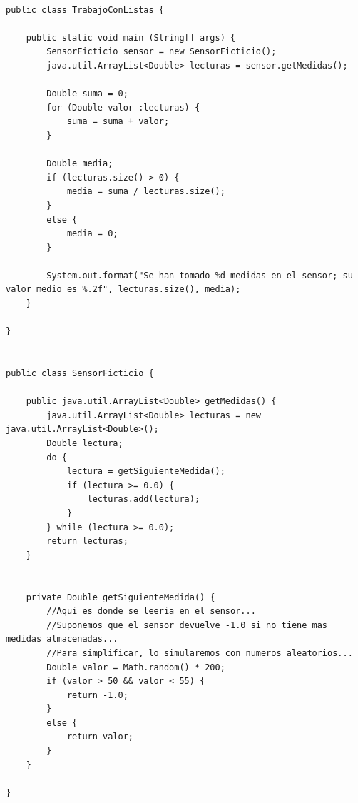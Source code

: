 \documentclass[spanish,12pt,a4paper,final,oneside]{book}
\begin{document}
\begin{lstlisting}[frame=single, caption=lenguaje java]

public class TrabajoConListas {
	
    public static void main (String[] args) {
        SensorFicticio sensor = new SensorFicticio();
        java.util.ArrayList<Double> lecturas = sensor.getMedidas();
        
        Double suma = 0;
        for (Double valor :lecturas) {
            suma = suma + valor;
        }
        
        Double media;
        if (lecturas.size() > 0) {
            media = suma / lecturas.size();
        }
        else {
            media = 0;
        }
        
        System.out.format("Se han tomado %d medidas en el sensor; su valor medio es %.2f", lecturas.size(), media);
    }
    
}


public class SensorFicticio {
    
    public java.util.ArrayList<Double> getMedidas() {
        java.util.ArrayList<Double> lecturas = new java.util.ArrayList<Double>();
        Double lectura;
        do {
            lectura = getSiguienteMedida();
            if (lectura >= 0.0) {
                lecturas.add(lectura);
            }
        } while (lectura >= 0.0);
        return lecturas;
    }
    
    
    private Double getSiguienteMedida() {
        //Aqui es donde se leeria en el sensor...
        //Suponemos que el sensor devuelve -1.0 si no tiene mas medidas almacenadas...
        //Para simplificar, lo simularemos con numeros aleatorios...
        Double valor = Math.random() * 200;
        if (valor > 50 && valor < 55) {
            return -1.0;
        }
        else {
            return valor;
        }
    }
    
}


\end{lstlisting}
\end{document}
